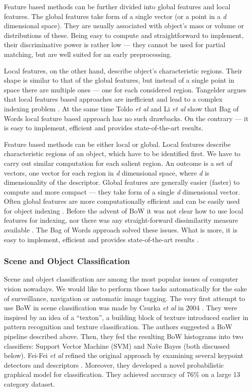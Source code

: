 \documentclass[11pt,twoside]{article}
\begin{document}
    Feature based methods can be further divided into global features and local features. The global features take form of a single vector (or a point in a \emph{d} dimensional space). They are usually associated with object's mass or volume or distributions of these. Being easy to compute and straightforward to implement, their discriminative power is rather low --- they cannot be used for partial matching, but are well suited for an early preprocessing. 
    
    Local features, on the other hand, describe object's characteristic regions. Their shape is similar to that of the global features, but instead of a single point in space there are multiple ones --- one for each considered region. Tangelder argues that local features based approaches are inefficient and lead to a complex indexing problem \cite{tangelder2008survey}. At the same time Toldo \emph{et al} and Li \emph{et al} show that Bag of Words local feature based approach has no such drawbacks. On the contrary --- it is easy to implement, efficient and provides state-of-the-art results.
    
    Feature based methods can be either local or global. Local features describe characteristic regions of an object, which have to be identified first. We have to carry out similar computation for each salient region. An outcome is a set of vectors, one vector for each region in \emph{d} dimensional space, where \emph{d} is dimensionality of the descriptor. Global features are generally easier (faster) to compute and more compact --- they take form of a single \emph{d} dimensional vector. Often global features are more computationally efficient and can be easily used for object indexing . Before the advent of BoW it was not clear how to use local features for indexing, nor there was any straight-forward dissimilarity measure available \cite{tangelder2008survey}. The Bag of Words approach solved these issues. What is more, it is easy to implement, efficient and provides state-of-the-art results \cite{li2010investigating}.
    
  \subsubsection{Scene and Object Classification}
    Scene and object classification are among the most popular issues of computer vision nowadays. We would like to perform those tasks automatically for the sake of surveillance, navigation or automatic image tagging. The very first attempt to use BoW in scene classification was made by Csurka \textit{et al} in 2004 \cite{csurka2004visual}. They were inspired by an idea of a ``texton'', a building block of texture introduced earlier in pattern recognition and texture classification. The authors suggested a BoW pipeline described above. Then, they fed the resulting BoW histograms into two classifiers: Support Vector Machine (SVM) and Na\`ve Bayes (both discussed below). Fei-Fei \emph{et al} refined the original approach by examining several keypoint detectors and descriptors \cite{fei2005bayesian}. Moreover, they developed a novel probabilistic graphical model for classification. They achieved accuracy of 76\% on a large 13 category dataset. 
    
\end{document}
